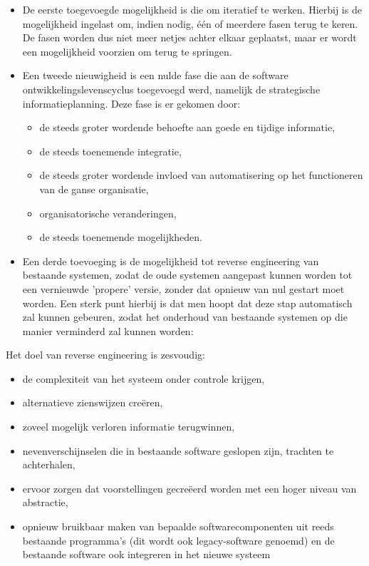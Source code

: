 \begin{itemize}
    \item De eerste toegevoegde mogelijkheid is die om iteratief te werken. Hierbij is de mogelijkheid ingelast om, indien nodig, één of meerdere fasen terug te keren. De fasen worden dus niet meer netjes achter elkaar geplaatst, maar er wordt een mogelijkheid voorzien om terug te springen.
    \item Een tweede nieuwigheid is een nulde fase die aan de software ontwikkelingslevenscyclus toegevoegd werd, namelijk de strategische informatieplanning. Deze fase is er gekomen door:
        \begin{itemize}
        \item de steeds groter wordende behoefte aan goede en tijdige informatie,
        \item de steeds toenemende integratie,
        \item de steeds groter wordende invloed van automatisering op het 
        functioneren van de ganse organisatie,
        \item organisatorische veranderingen,
        \item de steeds toenemende mogelijkheden.
        \end{itemize}
    \item Een derde toevoeging is de mogelijkheid tot reverse engineering van bestaande systemen, zodat de oude systemen aangepast kunnen worden tot een vernieuwde 'propere' versie, zonder dat opnieuw van nul gestart moet worden. Een sterk punt hierbij is dat men hoopt dat deze stap automatisch zal kunnen gebeuren, zodat het onderhoud van bestaande systemen op die manier verminderd zal kunnen worden:
\end{itemize}

Het doel van reverse engineering is zesvoudig:

\begin{itemize}
    \item de complexiteit van het systeem onder controle krijgen,
    \item alternatieve zienswijzen creëren,
    \item zoveel mogelijk verloren informatie terugwinnen,
    \item nevenverschijnselen die in bestaande software geslopen zijn, trachten te achterhalen,
    \item ervoor zorgen dat voorstellingen gecreëerd worden met een hoger niveau van abstractie,
    \item opnieuw bruikbaar maken van bepaalde softwarecomponenten uit reeds bestaande programma's (dit wordt ook legacy-software genoemd) en de bestaande software ook integreren in het nieuwe systeem
\end{itemize}

